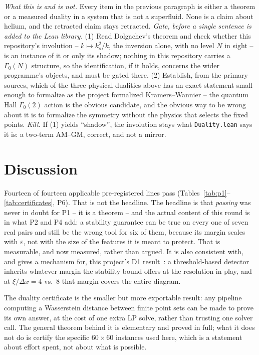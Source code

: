 \documentclass[11pt,a4paper]{article}
\newcommand{\lean}[1]{\texttt{\small #1}}
\begin{document}
\emph{What this is and is not.} Every item in the previous paragraph is either a theorem or a measured
duality in a system that is not a superfluid. None is a claim about helium, and the retracted claim stays
retracted. \emph{Gate, before a single sentence is added to the Lean library.} (1) Read
Dolgachev's theorem and check whether this repository's involution -- $k\mapsto k_s^2/k$, the inversion
alone, with no level $N$ in sight -- is an instance of it or only its shadow; nothing in this repository
carries a $\Gamma_0(N)$ structure, so the identification, if it holds, concerns the wider programme's
objects, and must be gated there. (2) Establish, from the primary sources, which of the three physical
dualities above has an exact statement small enough to formalize as the project formalized
Kramers--Wannier -- the quantum Hall $\Gamma_0(2)$ action is the obvious candidate, and the obvious way
to be wrong about it is to formalize the symmetry without the physics that selects the fixed points.
\emph{Kill.} If (1) yields ``shadow'', the involution stays what \lean{Duality.lean} says it is: a
two-term AM--GM, correct, and not a mirror.

\section{Discussion}

Fourteen of fourteen applicable pre-registered lines pass (Tables~\ref{tab:p1}--\ref{tab:certificates},
P6). That is not the headline. The headline is that \emph{passing} was never in doubt for P1 -- it is a
theorem -- and the actual content of this round is in what P2 and P4 add: a stability guarantee can be
true on every one of seven real pairs and still be the wrong tool for six of them, because its margin
scales with $\varepsilon$, not with the size of the features it is meant to protect. That is measurable,
and now measured, rather than argued. It is also consistent with, and gives a mechanism for, this
project's D1 result~\cite{Callens2026TDA}: a threshold-based detector inherits whatever margin the
stability bound offers at the resolution in play, and at $\xi/\Delta x=4$ vs.\ $8$ that margin covers
the entire diagram.

The duality certificate is the smaller but more exportable result: any pipeline computing a Wasserstein
distance between finite point sets can be made to prove its own answer, at the cost of one extra LP
solve, rather than trusting one solver call. The general theorem behind it is elementary and proved in
full; what it does not do is certify the specific $60\times60$ instances used here, which is a
statement about effort spent, not about what is possible.
\end{document}
